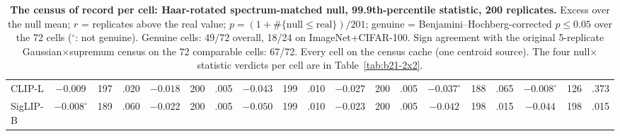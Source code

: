 \begin{table}[H]
\begin{tabular}{lcccccccccccccccccc}
CLIP-L & $-0.009$ & 197 & .020 & $-0.018$ & 200 & .005 & $-0.043$ & 199 & .010 & $-0.027$ & 200 & .005 & $-0.037^{\circ}$ & 188 & .065 & $-0.008^{\circ}$ & 126 & .373 \\
SigLIP-B & $-0.008^{\circ}$ & 189 & .060 & $-0.022$ & 200 & .005 & $-0.050$ & 199 & .010 & $-0.023$ & 200 & .005 & $-0.042$ & 198 & .015 & $-0.044$ & 198 & .015 \\
\bottomrule
\end{tabular}
\caption{\textbf{The census of record per cell: Haar-rotated spectrum-matched null, 99.9th-percentile statistic, 200 replicates.} Excess over the null mean; $r$ = replicates above the real value; $p=(1+\#\{\text{null}\le\text{real}\})/201$; genuine = Benjamini--Hochberg-corrected $p\le0.05$ over the 72 cells ($^{\circ}$: not genuine). Genuine cells: 49/72 overall, 18/24 on ImageNet+CIFAR-100. Sign agreement with the original 5-replicate Gaussian$\times$supremum census on the 72 comparable cells: 67/72. Every cell on the census cache (one centroid source). The four null$\times$statistic verdicts per cell are in Table~\ref{tab:b21-2x2}.}
\label{tab:b20-census200}
\end{table}
